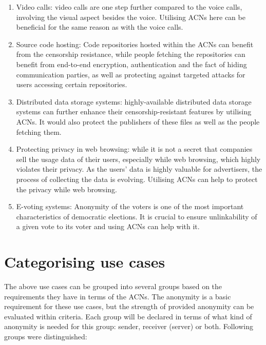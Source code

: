 \begin{enumerate}
    \item Video calls: video calls are one step further compared to the voice calls, involving the visual aspect besides the voice. Utilising ACNs here can be beneficial for the same reason as with the voice calls.
    \item Source code hosting: Code repositories hosted within the ACNs can benefit from the censorship resistance, while people fetching the repositories can benefit from end-to-end encryption, authentication and the fact of hiding communication parties, as well as protecting against targeted attacks for users accessing certain repositories.
    \item Distributed data storage systems: highly-available distributed data storage systems can further enhance their censorship-resistant features by utilising ACNs. It would also protect the publishers of these files as well as the people fetching them.
    \item Protecting privacy in web browsing: while it is not a secret that companies sell the usage data of their users, especially while web browsing, which highly violates their privacy. As the users’ data is highly valuable for advertisers, the process of collecting the data is evolving. Utilising ACNs can help to protect the privacy while web browsing.
    \item E-voting systems: Anonymity of the voters is one of the most important characteristics of democratic elections. It is crucial to ensure unlinkability of a given vote to its voter and using ACNs can help with it.
\end{enumerate}


\section{Categorising use cases}
The above use cases can be grouped into several groups based on the requirements they have in terms of the ACNs. The anonymity is a basic requirement for these use cases, but the strength of provided anonymity can be evaluated within criteria. Each group will be declared in terms of what kind of anonymity is needed for this group: sender, receiver (server) or both. Following groups were distinguished:

